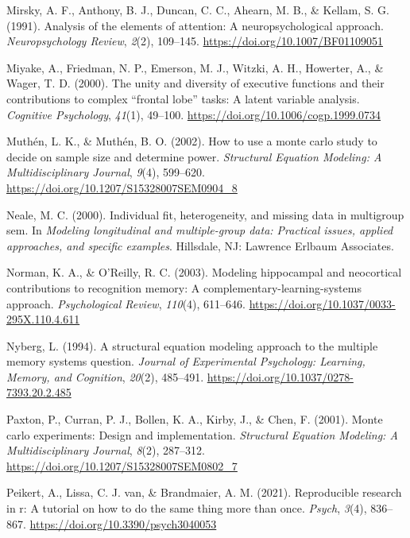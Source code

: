 \documentclass[
  man,floatsintext]{apa6}
\newlength{\cslhangindent}
\newlength{\cslentryspacingunit} %
\newenvironment{CSLReferences}[2] %
 {%
  \setlength{\parindent}{0pt}
  \ifodd #1
  \let\oldpar\par
  \def\par{\hangindent=\cslhangindent\oldpar}
  \fi
  \setlength{\parskip}{#2\cslentryspacingunit}
 }%
 {}
\begin{document}
\begin{CSLReferences}{1}{0}
\leavevmode{}%
Mirsky, A. F., Anthony, B. J., Duncan, C. C., Ahearn, M. B., \& Kellam, S. G. (1991). Analysis of the elements of attention: A neuropsychological approach. \emph{Neuropsychology Review}, \emph{2}(2), 109--145. \url{https://doi.org/10.1007/BF01109051}

\leavevmode{}%
Miyake, A., Friedman, N. P., Emerson, M. J., Witzki, A. H., Howerter, A., \& Wager, T. D. (2000). The unity and diversity of executive functions and their contributions to complex {``frontal lobe''} tasks: A latent variable analysis. \emph{Cognitive Psychology}, \emph{41}(1), 49--100. \url{https://doi.org/10.1006/cogp.1999.0734}

\leavevmode{}%
Muthén, L. K., \& Muthén, B. O. (2002). How to use a monte carlo study to decide on sample size and determine power. \emph{Structural Equation Modeling: A Multidisciplinary Journal}, \emph{9}(4), 599--620. \url{https://doi.org/10.1207/S15328007SEM0904_8}

\leavevmode{}%
Neale, M. C. (2000). Individual fit, heterogeneity, and missing data in multigroup sem. In \emph{Modeling longitudinal and multiple-group data: Practical issues, applied approaches, and specific examples}. Hillsdale, {NJ}: Lawrence Erlbaum Associates.

\leavevmode{}%
Norman, K. A., \& O'Reilly, R. C. (2003). Modeling hippocampal and neocortical contributions to recognition memory: A complementary-learning-systems approach. \emph{Psychological Review}, \emph{110}(4), 611--646. \url{https://doi.org/10.1037/0033-295X.110.4.611}

\leavevmode{}%
Nyberg, L. (1994). A structural equation modeling approach to the multiple memory systems question. \emph{Journal of Experimental Psychology: Learning, Memory, and Cognition}, \emph{20}(2), 485--491. \url{https://doi.org/10.1037/0278-7393.20.2.485}

\leavevmode{}%
Paxton, P., Curran, P. J., Bollen, K. A., Kirby, J., \& Chen, F. (2001). Monte carlo experiments: Design and implementation. \emph{Structural Equation Modeling: A Multidisciplinary Journal}, \emph{8}(2), 287--312. \url{https://doi.org/10.1207/S15328007SEM0802_7}

\leavevmode{}%
Peikert, A., Lissa, C. J. van, \& Brandmaier, A. M. (2021). Reproducible research in r: A tutorial on how to do the same thing more than once. \emph{Psych}, \emph{3}(4), 836--867. \url{https://doi.org/10.3390/psych3040053}


\end{CSLReferences}
\end{document}

